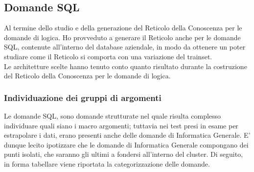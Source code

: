 \subsection{Domande SQL}
\label{Domande SQL}
Al termine dello studio e della generazione del Reticolo della Conoscenza per le domande di logica. Ho provveduto a generare il Reticolo anche per le domande SQL, contenute all'interno del database aziendale, in modo da ottenere un poter studiare come il Reticolo si comporta con una variazione del trainset.\\
Le architetture scelte hanno tenuto conto quanto risultato durante la costruzione del Reticolo della Conoscenza per le domande di logica.

\subsubsection{Individuazione dei gruppi di argomenti}
\label{Individuazione dei gruppi di argomenti 120}
Le domande SQL, sono domande strutturate nel quale risulta complesso individuare quali siano i macro argomenti; tuttavia nei test presi in esame per estrapolare i dati, erano presenti anche delle domande di Informatica Generale.
E' dunque lecito ipotizzare che le domande di Informatica Generale compongano dei punti isolati, che saranno gli ultimi a fondersi all'interno del cluster.
\noindent
Di seguito, in forma tabellare viene riportata la categorizzazione delle domande.
